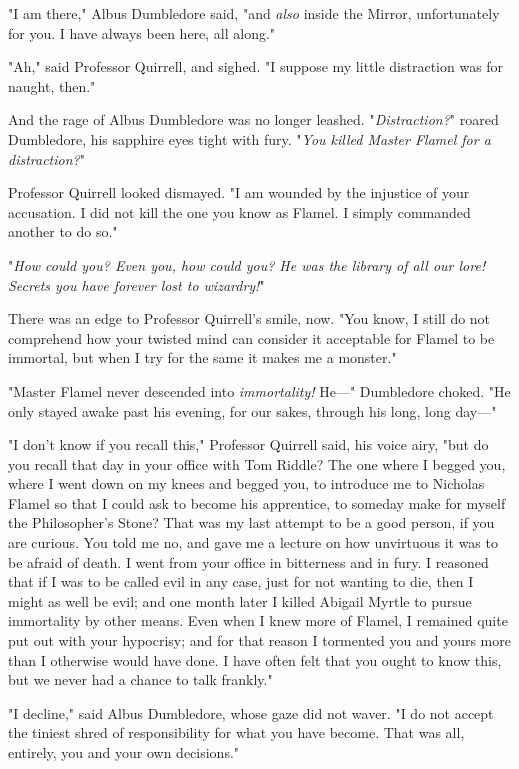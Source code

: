 "I am there," Albus Dumbledore said, "and \emph{also} inside the Mirror,
unfortunately for you. I have always been here, all along."

"Ah," said Professor Quirrell, and sighed. "I suppose my little distraction was
for naught, then."

And the rage of Albus Dumbledore was no longer leashed. "\emph{Distraction?}"
roared Dumbledore, his sapphire eyes tight with fury. "\emph{You killed Master
Flamel for a distraction?}"

Professor Quirrell looked dismayed. "I am wounded by the injustice of your
accusation. I did not kill the one you know as Flamel. I simply commanded
another to do so."

"\emph{How could you? Even you, how could you? He was the library of all our
lore! Secrets you have forever lost to wizardry!}"

There was an edge to Professor Quirrell's smile, now. "You know, I still do not
comprehend how your twisted mind can consider it acceptable for Flamel to be
immortal, but when I try for the same it makes me a monster."

"Master Flamel never descended into \emph{immortality!} He---" Dumbledore
choked. "He only stayed awake past his evening, for our sakes, through his
long, long day---"

"I don't know if you recall this," Professor Quirrell said, his voice airy,
"but do you recall that day in your office with Tom Riddle? The one where I
begged you, where I went down on my knees and begged you, to introduce me to
Nicholas Flamel so that I could ask to become his apprentice, to someday make
for myself the Philosopher's Stone? That was my last attempt to be a good
person, if you are curious. You told me no, and gave me a lecture on how
unvirtuous it was to be afraid of death. I went from your office in bitterness
and in fury. I reasoned that if I was to be called evil in any case, just for
not wanting to die, then I might as well be evil; and one month later I killed
Abigail Myrtle to pursue immortality by other means. Even when I knew more of
Flamel, I remained quite put out with your hypocrisy; and for that reason I
tormented you and yours more than I otherwise would have done. I have often
felt that you ought to know this, but we never had a chance to talk frankly."

"I decline," said Albus Dumbledore, whose gaze did not waver. "I do not accept
the tiniest shred of responsibility for what you have become. That was all,
entirely, you and your own decisions."

